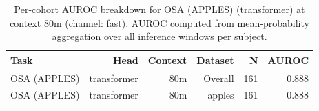 \begin{table}[ht]
\centering
\caption{Per-cohort AUROC breakdown for OSA (APPLES) (transformer) at context 80m (channel: fast). AUROC computed from mean-probability aggregation over all inference windows per subject.}
\label{tab:cohort_osa_binary_apples_postqc_transformer_fast}
\begin{tabular}{lrrrrr}
\toprule
Task & Head & Context & Dataset & N & AUROC \\
\midrule
OSA (APPLES) & transformer & 80m & Overall & 161 & 0.888 \\
OSA (APPLES) & transformer & 80m & apples & 161 & 0.888 \\
\bottomrule
\end{tabular}
\end{table}